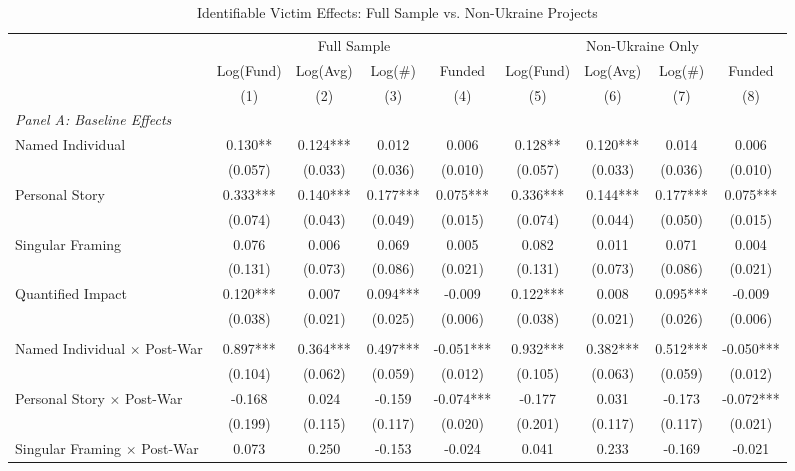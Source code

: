\begin{table}[htbp]
\centering
\caption{Identifiable Victim Effects: Full Sample vs. Non-Ukraine Projects}
\label{tab:identifiable}
\begin{threeparttable}
\small
\begin{tabular}{lcccccccc}
\toprule
& \multicolumn{4}{c}{Full Sample} & \multicolumn{4}{c}{Non-Ukraine Only} \\
\cmidrule(lr){2-5} \cmidrule(lr){6-9}
& Log(Fund) & Log(Avg) & Log(\#) & Funded & Log(Fund) & Log(Avg) & Log(\#) & Funded \\
& (1) & (2) & (3) & (4) & (5) & (6) & (7) & (8) \\
\midrule
\multicolumn{9}{l}{\textit{Panel A: Baseline Effects}} \\
Named Individual & 0.130** & 0.124*** & 0.012 & 0.006 & 0.128** & 0.120*** & 0.014 & 0.006 \\
& (0.057) & (0.033) & (0.036) & (0.010) & (0.057) & (0.033) & (0.036) & (0.010) \\
Personal Story & 0.333*** & 0.140*** & 0.177*** & 0.075*** & 0.336*** & 0.144*** & 0.177*** & 0.075*** \\
& (0.074) & (0.043) & (0.049) & (0.015) & (0.074) & (0.044) & (0.050) & (0.015) \\
Singular Framing & 0.076 & 0.006 & 0.069 & 0.005 & 0.082 & 0.011 & 0.071 & 0.004 \\
& (0.131) & (0.073) & (0.086) & (0.021) & (0.131) & (0.073) & (0.086) & (0.021) \\
Quantified Impact & 0.120*** & 0.007 & 0.094*** & -0.009 & 0.122*** & 0.008 & 0.095*** & -0.009 \\
& (0.038) & (0.021) & (0.025) & (0.006) & (0.038) & (0.021) & (0.026) & (0.006) \\
\addlinespace
\multicolumn{9}{l}{\textit{Panel B: Post-War Interactions}} \\
Named Individual $\times$ Post-War & 0.897*** & 0.364*** & 0.497*** & -0.051*** & 0.932*** & 0.382*** & 0.512*** & -0.050*** \\
& (0.104) & (0.062) & (0.059) & (0.012) & (0.105) & (0.063) & (0.059) & (0.012) \\
Personal Story $\times$ Post-War & -0.168 & 0.024 & -0.159 & -0.074*** & -0.177 & 0.031 & -0.173 & -0.072*** \\
& (0.199) & (0.115) & (0.117) & (0.020) & (0.201) & (0.117) & (0.117) & (0.021) \\
Singular Framing $\times$ Post-War & 0.073 & 0.250 & -0.153 & -0.024 & 0.041 & 0.233 & -0.169 & -0.021 \\

\end{tabular}
\end{threeparttable}
\end{table}

